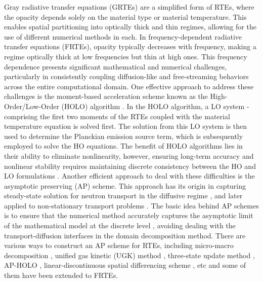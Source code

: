 \documentclass[preprint,12pt]{elsarticle}
\theoremstyle{definition}
\theoremstyle{plain}
\numberwithin{equation}{section}
\numberwithin{algorithm}{section}
\newcounter{eq_count}
\newcounter{thm_count}
\newcounter{tab_count}
\newcounter{alg_count}
\begin{document}
Gray radiative transfer equations (GRTEs) are a simplified form of RTEs, where the opacity depends solely on the material type or material temperature. This enables spatial partitioning into optically thick and thin regimes, allowing for the use of different numerical methods in each. In frequency-dependent radiative transfer equations (FRTEs), opacity typically decreases with frequency, making a regime optically thick at low frequencies but thin at high ones. This frequency dependence presents significant mathematical and numerical challenges, particularly in consistently coupling diffusion-like and free-streaming behaviors across the entire computational domain. 
One effective approach to address these challenges is the moment-based acceleration scheme known as the High-Order/Low-Order (HOLO) algorithm \cite{chacon2017multiscale,yee2017stable,park2019multigroup,bolding2017high,ZHANG2023112368,feng2025decomposed}. In the HOLO algorithm, a LO system - comprising the first two moments of the RTEs coupled with the material temperature equation is solved first.  The solution from this LO system is then used to determine the Planckian emission source term, which is subsequently employed to solve the HO equations. The benefit of HOLO algorithms lies in their ability to eliminate nonlinearity, however, ensuring long-term accuracy and nonlinear stability requires maintaining discrete consistency between the HO and LO formulations \cite{chacon2017multiscale}.
Another efficient approach to deal with these difficulties is the asymptotic preserving (AP) scheme. 
This approach has its origin in capturing steady-state solution for neutron transport in the diffusive regime \cite{larsen1987asymptotic,larsen1989asymptotic}, and later applied to non-stationary transport problems \cite{klar1998asymptotic}. The basic idea behind AP schemes is to ensure that the numerical method accurately captures the asymptotic limit of the mathematical model at the discrete level \cite{jin2022asymptotic}, avoiding dealing with the transport-diffusion interfaces in the domain decomposition method. There are various ways to construct an AP scheme for RTEs, including micro-macro decomposition \cite{shi2023efficient,xiong2022high}, unified gas kinetic (UGK) method \cite{sun2015asymptoticB,shi2020asymptotic,sun2015asymptoticA,li2020unified,liu2023implicit,yang2025unified,xu2021positive,xu2024spatial}, three-state update method \cite{tang2021accurate}, AP-HOLO \cite{ZHANG2023112368,feng2025decomposed,park2020toward}, linear-discontinuous spatial differencing scheme \cite{morel1996linear}, etc and some of them have been extended to FRTEs.
\end{document}
